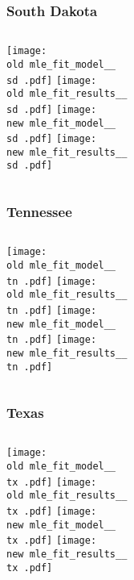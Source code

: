 \documentclass{beamer}
\newcommand{\old}{current_two_stage_output/pyseir/state_summaries/reports/}
\newcommand{\new}{new_shortest_t_delta/pyseir/state_summaries/reports/}
\newcommand{\sd}{South Dakota__46}
\newcommand{\tn}{Tennessee__47}
\newcommand{\tx}{Texas__48}
\begin{document}
\begin{frame}
\frametitle{South Dakota}
    \begin{columns}[t]
       \texttt{[image: \\old mle\_fit\_model\_\_\\sd .pdf]}
       \texttt{[image: \\old mle\_fit\_results\_\_\\sd .pdf]}   
       \texttt{[image: \\new mle\_fit\_model\_\_\\sd .pdf]}
       \texttt{[image: \\new mle\_fit\_results\_\_\\sd .pdf]}   
\end{columns}
\end{frame}

\begin{frame}
\frametitle{Tennessee}
    \begin{columns}[t]
       \texttt{[image: \\old mle\_fit\_model\_\_\\tn .pdf]}
       \texttt{[image: \\old mle\_fit\_results\_\_\\tn .pdf]}   
       \texttt{[image: \\new mle\_fit\_model\_\_\\tn .pdf]}
       \texttt{[image: \\new mle\_fit\_results\_\_\\tn .pdf]}   
\end{columns}
\end{frame}

\begin{frame}
\frametitle{Texas}
    \begin{columns}[t]
       \texttt{[image: \\old mle\_fit\_model\_\_\\tx .pdf]}
       \texttt{[image: \\old mle\_fit\_results\_\_\\tx .pdf]}   
       \texttt{[image: \\new mle\_fit\_model\_\_\\tx .pdf]}
       \texttt{[image: \\new mle\_fit\_results\_\_\\tx .pdf]}   
\end{columns}
\end{frame}
\end{document}

